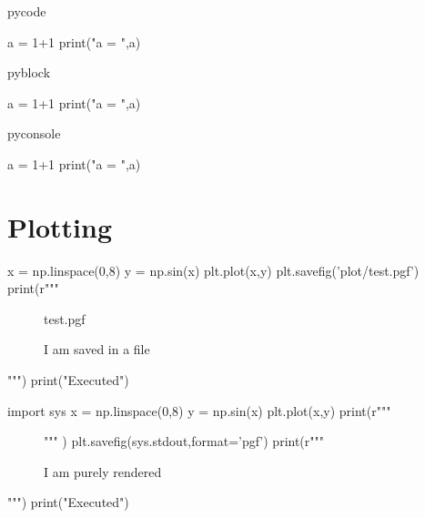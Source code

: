 \documentclass[a4paper]{article}
\begin{document}
pycode
\begin{pycode}
a = 1+1
print("a = ",a)
\end{pycode}

pyblock
\begin{pyblock}
a = 1+1
print("a = ",a)
\end{pyblock}

pyconsole
\begin{pyconsole}
a = 1+1
print("a = ",a)
\end{pyconsole}

\section{Plotting}%
\label{sec:plotting}



\begin{pycode}
x = np.linspace(0,8)
y = np.sin(x)
plt.plot(x,y)
plt.savefig('plot/test.pgf')
print(r"""
\begin{figure}[ht]
	\centering
	{test.pgf}
	\caption{I am saved in a file}
\end{figure} """)
print("Executed")
\end{pycode}

\begin{pycode}
import sys
x = np.linspace(0,8)
y = np.sin(x)
plt.plot(x,y)
print(r"""
\begin{figure}[ht]
	\centering""" )
plt.savefig(sys.stdout,format='pgf')
print(r"""
\caption{I am purely rendered}
\end{figure} """)
print("Executed")
\end{pycode}
\end{document}
